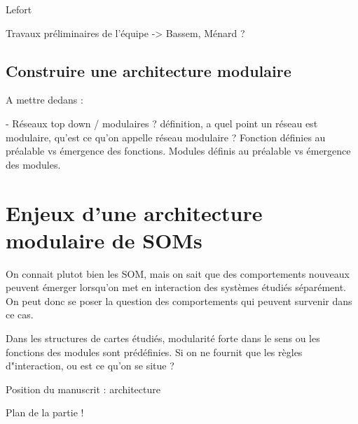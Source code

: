 \cite{parisiLL}

Lefort

Travaux préliminaires de l'équipe ->  Bassem, Ménard ?



\subsection{Construire une architecture modulaire}

A mettre dedans : 

- Réseaux top down / modulaires ? définition, a quel point un réseau est modulaire, qu'est ce qu'on appelle réseau modulaire ? 
Fonction définies au préalable vs émergence des fonctions. 
Modules définis au préalable vs émergence des modules. 




\section{Enjeux d'une architecture modulaire de SOMs}

On connait plutot bien les SOM, mais on sait que des comportements nouveaux peuvent émerger lorsqu'on met en interaction des systèmes étudiés séparément. 
On peut donc se poser la question des comportements qui peuvent survenir dans ce cas.

Dans les structures de cartes étudiés, modularité forte dans le sens ou les fonctions des modules sont prédéfinies. Si on ne fournit que les règles d"interaction, ou est ce qu'on se situe ? 
 
 
Position du manuscrit : architecture 

Plan de la partie ! 

 

